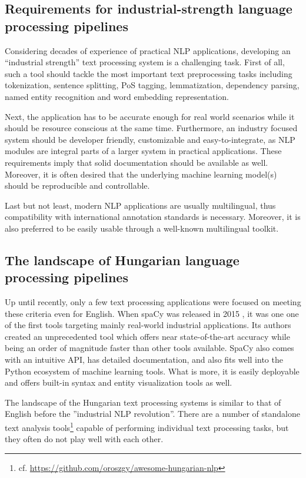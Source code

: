 \documentclass{llncs}
\begin{document}
\subsection{Requirements for industrial-strength language processing pipelines}

Considering decades of experience of practical NLP applications, developing an “industrial strength” text processing system is a challenging task. First of all, such a tool should tackle the most important text preprocessing tasks including tokenization, sentence splitting, PoS tagging, lemmatization, dependency parsing, named entity recognition and word embedding representation. 

Next, the application has to be accurate enough for real world scenarios while it should be resource conscious at the same time. Furthermore, an industry focused system should be developer friendly, customizable and easy-to-integrate, as NLP modules are integral parts of a larger system in practical applications. These requirements imply that solid documentation should be available as well. Moreover, it is often desired that the underlying machine learning model(s) should be reproducible and controllable.

Last but not least, modern NLP applications are usually multilingual, thus compatibility with international annotation standards  \citep{udpos,univedepv1,UniDep,unimorph} is necessary. Moreover, it is also preferred to be easily usable through a well-known multilingual toolkit.


\subsection{The landscape of Hungarian language processing pipelines}

Up until recently, only a few text processing applications were focused on meeting these criteria even for English. When spaCy was released in 2015 \citep{spacy}, it was one one of the first tools targeting mainly real-world industrial applications. Its authors created an unprecedented tool which offers near state-of-the-art accuracy while being an order of magnitude faster than other tools available. SpaCy also comes with an intuitive API, has detailed documentation, and also fits well into the Python ecosystem of machine learning tools. What is more, it is easily deployable and offers built-in syntax and entity visualization tools as well.

The landscape of the Hungarian text processing systems is similar to that of English before the ''industrial NLP revolution''. There are a number of standalone text analysis tools\footnote{cf. \url{https://github.com/oroszgy/awesome-hungarian-nlp}} \citep{metanet} capable of performing individual text processing tasks, but they often do not play well with each other. 
\end{document}
